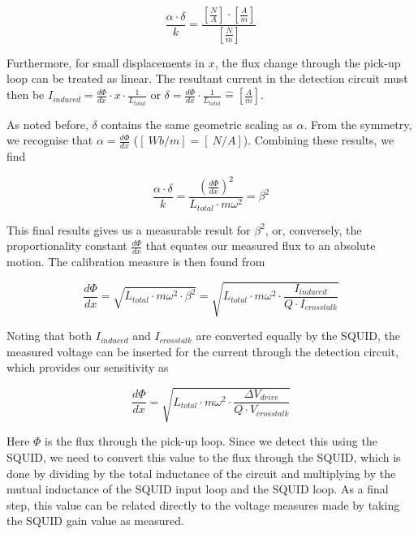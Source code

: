 \begin{appendices}
\begin{equation}
    \frac{\alpha\cdot\delta}{k} = 
    \frac{\si{\left[\frac{N}{A}\right]}\cdot\si{\left[\frac{A}{m}\right]}}{\si{\left[\frac{N}{m}\right]}}
\end{equation}

Furthermore, for small displacements in $x$, the flux change through the pick-up loop can be treated as linear. The resultant current in the detection circuit must then be $I_{induced} = \frac{d\Phi}{dx}\cdot x \cdot \frac{1}{L_{total}}$ or $\delta = \frac{d\Phi}{dx}\cdot \frac{1}{L_{total}} \hat{=} \si{\left[\frac{A}{m}\right]}$.

As noted before, $\delta$ contains the same geometric scaling as $\alpha$. From the symmetry, we recognise that $\alpha = \frac{d\Phi}{dx}$ ($\left[\SI{}{Wb/m}\right]= \left[\SI{}{N/A}\right]$). Combining these results, we find

\begin{equation}
    \frac{\alpha\cdot\delta}{k} = \frac{\left(\frac{d\Phi}{dx}\right)^2}{L_{total}\cdot m\omega^2} = \beta^2
\end{equation}

This final results gives us a measurable result for $\beta^2$, or, conversely, the proportionality constant $\frac{d\Phi}{dx}$ that equates our measured flux to an absolute motion. The calibration measure is then found from 

\begin{equation} \label{eq:dphi_dx_beta}
    \frac{d\Phi}{dx} = \sqrt{L_{total}\cdot m\omega^2\cdot \beta^2} = \sqrt{L_{total}\cdot m\omega^2\cdot \frac{I_{induced}}{Q\cdot I_{crosstalk}}} 
\end{equation} 

Noting that both $I_{induced}$ and $I_{crosstalk}$ are converted equally by the SQUID, the measured voltage can be inserted for the current through the detection circuit, which provides our sensitivity as 

\begin{equation}
    \frac{d\Phi}{dx} = \sqrt{L_{total}\cdot m\omega^2\cdot \frac{\Delta V_{drive}}{Q\cdot V_{crosstalk}}}
\end{equation}

Here $\Phi$ is the flux through the pick-up loop. Since we detect this using the SQUID, we need to convert this value to the flux through the SQUID, which is done by dividing by the total inductance of the circuit and multiplying by the mutual inductance of the SQUID input loop and the SQUID loop. As a final step, this value can be related directly to the voltage measures made by taking the SQUID gain value as measured.  


\end{appendices}
